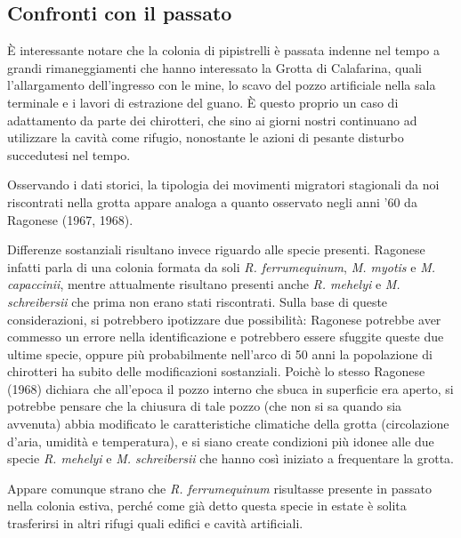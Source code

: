 \begin{multicols}{2}
\subsection*{Confronti con il passato}
È interessante notare che la colonia di pipistrelli è passata indenne nel tempo a grandi rimaneggiamenti che hanno interessato la Grotta di Calafarina, quali l’allargamento dell’ingresso con le mine, lo scavo del pozzo artificiale nella sala terminale e i lavori di estrazione del guano. È questo proprio un caso di adattamento da parte dei chirotteri, che sino ai giorni nostri continuano ad utilizzare la cavità come rifugio, nonostante le azioni di pesante disturbo succedutesi nel tempo.

Osservando i dati storici, la tipologia dei movimenti migratori stagionali da noi riscontrati nella grotta appare analoga a quanto osservato negli anni ’60 da Ragonese (1967, 1968).

Differenze sostanziali risultano invece riguardo alle specie presenti. Ragonese infatti parla di una colonia formata da soli \emph{R. ferrumequinum}, \emph{M. myotis} e \emph{M. capaccinii}, mentre attualmente risultano presenti anche \emph{R. mehelyi} e \emph{M. schreibersii} che prima non erano stati riscontrati. Sulla base di queste considerazioni, si potrebbero ipotizzare due possibilità: Ragonese potrebbe aver commesso un errore nella identificazione e potrebbero essere sfuggite queste due ultime specie, oppure più probabilmente nell’arco di 50 anni la popolazione di chirotteri ha subito delle modificazioni sostanziali. Poichè lo stesso Ragonese (1968) dichiara che all’epoca il pozzo interno che sbuca in superficie era aperto, si potrebbe pensare che la chiusura di tale pozzo (che non si sa quando sia avvenuta) abbia modificato le caratteristiche climatiche della grotta (circolazione d’aria, umidità e temperatura), e si siano create condizioni più idonee alle due specie \emph{R. mehelyi} e \emph{M. schreibersii} che hanno così iniziato a frequentare la grotta. 

Appare comunque strano che \emph{R. ferrumequinum} risultasse presente in passato nella colonia estiva, perché come già detto questa specie in estate è solita trasferirsi in altri rifugi quali edifici e cavità artificiali.


\end{multicols}
